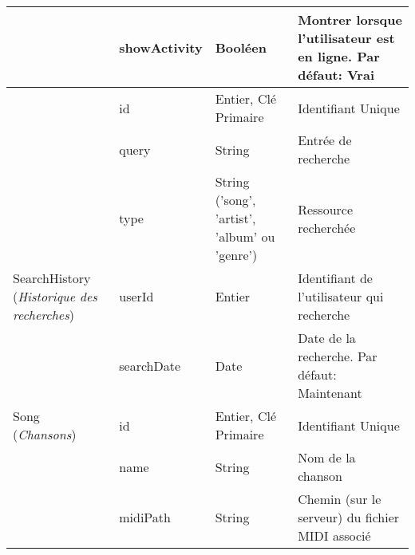 \begin{longtable}[c]{@{}|p{}|p{}|p{}|p{}|@{}}
									                    & showActivity                                         & Booléen                                                                                  & Montrer lorsque l’utilisateur est en ligne. Par défaut: Vrai                             \\* \hline
														& id                                                   & Entier, Clé Primaire                                                                     & Identifiant Unique                                                                       \\* \cline{2-4} 
														& query                                                & String                                                                                   & Entrée de recherche                                                                      \\* \cline{2-4} 
														& type                                                 & String ('song', 'artist',  'album' ou 'genre') & Ressource recherchée                                                                     \\* \cline{2-4} 
	\multirow{-4}{0.18\textwidth}{SearchHistory (\textit{Historique des recherches})}						& userId                                               & Entier                                                                                   & Identifiant de l’utilisateur qui recherche                                               \\* \cline{2-4} 
									                    & searchDate                                           & Date                                                                                     & Date de la recherche. Par défaut: Maintenant                                             \\* \hline
	\multirow{0}{0.18\textwidth}{Song (\textit{Chansons})}								& id                                                   & Entier, Clé Primaire                                                                     & Identifiant Unique                                                                       \\* \cline{2-4} 
														& name                                                 & String                                                                                   & Nom de la chanson                                                                        \\* \cline{2-4} 
														& midiPath                                             & String                                                                                   & Chemin (sur le serveur) du fichier MIDI associé                                          \\* \cline{2-4} 

\end{longtable}
